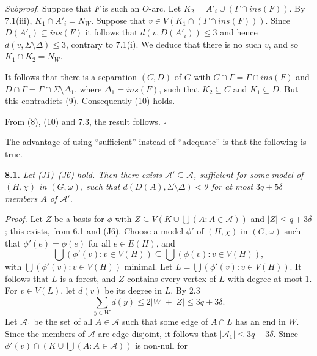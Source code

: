 \textit{Subproof.} Suppose that $F$ is such an $O$-arc. Let $K_2 = A'_i \cup (\Gamma \cap ins(F))$. By 7.1(iii), $K_1 \cap A'_i = N_W$. Suppose that $v \in V(K_1 \cap (\Gamma \cap ins(F)))$. Since $D(A'_i) \subseteq ins(F)$ it follows that $d(v, D(A'_i)) \le 3$ and hence $d(v, \Sigma \setminus \Delta) \le 3$, contrary to 7.1(i). We deduce that there is no such $v$, and so $K_1 \cap K_2 = N_W$.

It follows that there is a separation $(C, D)$ of $G$ with $C \cap \Gamma = \Gamma \cap ins(F)$ and $D \cap \Gamma = \Gamma \cap \Sigma \setminus \Delta_1$, where $\Delta_1 = ins(F)$, such that $K_2 \subseteq C$ and $K_1 \subseteq D$. But this contradicts (9). Consequently (10) holds.

From (8), (10) and 7.3, the result follows. $\square$


The advantage of using ``sufficient'' instead of ``adequate'' is that the following is true.

\textbf{8.1.} \textit{Let (J1)--(J6) hold. Then there exists $\mathcal{A}' \subseteq \mathcal{A}$, sufficient for some model of $(H, \chi)$ in $(G, \omega)$, such that $d(D(A), \Sigma \setminus \Delta) < \theta$ for at most $3q + 5\delta$ members $A$ of $\mathcal{A}'$.}

\textit{Proof.} Let $Z$ be a basis for $\phi$ with $Z \subseteq V(K \cup \bigcup(A : A \in \mathcal{A}))$ and $|Z| \le q + 3\delta$; this exists, from 6.1 and (J6). Choose a model $\phi'$ of $(H, \chi)$ in $(G, \omega)$ such that $\phi'(e) = \phi(e)$ for all $e \in E(H)$, and
\begin{equation*}
\bigcup(\phi'(v) : v \in V(H)) \subseteq \bigcup(\phi(v) : v \in V(H)),
\end{equation*}
with $\bigcup(\phi'(v) : v \in V(H))$ minimal. Let $L = \bigcup(\phi'(v) : v \in V(H))$. It follows that $L$ is a forest, and $Z$ contains every vertex of $L$ with degree at most 1. For $v \in V(L)$, let $d(v)$ be its degree in $L$. By 2.3
\begin{equation*}
\sum_{y \in W} d(y) \le 2|W| + |Z| \le 3q + 3\delta.
\end{equation*}
Let $\mathcal{A}_1$ be the set of all $A \in \mathcal{A}$ such that some edge of $A \cap L$ has an end in $W$. Since the members of $\mathcal{A}$ are edge-disjoint, it follows that $|\mathcal{A}_1| \le 3q + 3\delta$. Since $\phi'(v) \cap (K \cup \bigcup(A : A \in \mathcal{A}))$ is non-null for
